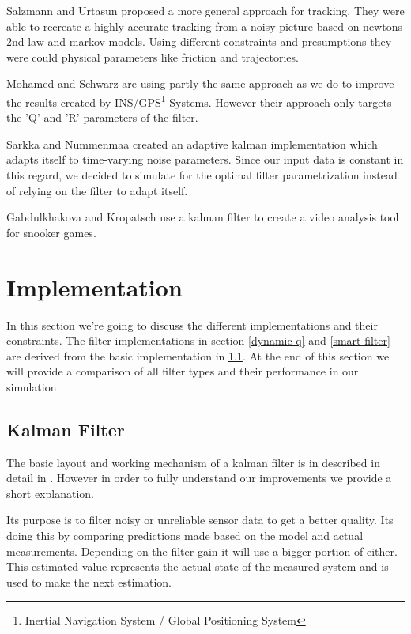 \documentclass[notitlepage, a4paper, 11pt]{scrartcl}
\begin{document}
\begin{multicols}{2}
Salzmann and Urtasun \cite{salzmann} proposed a more general approach for tracking. They were able to recreate a highly accurate tracking from a noisy picture based on newtons 2nd law and markov models.
Using different constraints and presumptions they were could physical parameters like friction and trajectories.

Mohamed and Schwarz \cite{schwarz} are using partly the same approach as we do to improve the results created by INS/GPS\footnote{Inertial Navigation System / Global Positioning System} Systems.
However their approach only targets the 'Q' and 'R' parameters of the filter.

Sarkka and Nummenmaa \cite{sarkka} created an adaptive kalman implementation which adapts itself to time-varying noise parameters. Since our input data is constant in this regard,
we decided to simulate for the optimal filter parametrization instead of relying on the filter to adapt itself.

Gabdulkhakova and Kropatsch \cite{kropatsch} use a kalman filter to create a video analysis tool for snooker games. 

\section{Implementation} \label{implementation}
In this section we're going to discuss the different implementations and their constraints. The filter implementations in section \cref{dynamic-q} and \cref{smart-filter} are derived from
the basic implementation in \cref{kalman-basic}. At the end of this section we will provide a comparison of all filter types and their performance in our simulation.

\subsection{Kalman Filter} \label{kalman-basic}

The basic layout and working mechanism of a kalman filter is in described in detail in \cite{kalman}. However in order to fully understand our improvements we provide a short explanation.

Its purpose is to filter noisy or unreliable sensor data to get a better quality. Its doing this by comparing predictions made based on the model and actual measurements. 
Depending on the filter gain it will use a bigger portion of either. This estimated value represents the actual state of the measured system and is used to make the next estimation.


\end{multicols}
\end{document}
